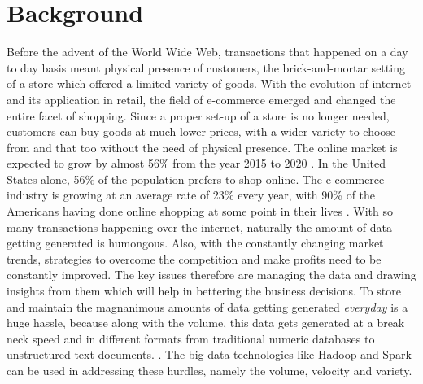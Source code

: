 \section{Background}
Before the advent of the World Wide Web, transactions that happened on a day to day basis meant physical presence of customers, the brick-and-mortar setting of a store which offered a limited variety of goods. With the evolution of internet and its application in retail, the field of e-commerce emerged and changed the entire facet of shopping. Since a proper set-up of a store is no longer needed, customers can buy goods at much lower prices, with a wider variety to choose from and that too without the need of physical presence. The online market is expected to grow by almost 56\% from the year 2015 to 2020 \cite{link2}. In the United States alone, 56\% of the population prefers to shop online. The e-commerce industry is growing at an average rate of 23\% every year, with 90\% of the Americans having done online shopping at some point in their lives \cite{link3}. With so many transactions happening over the internet, naturally the amount of data getting generated is humongous. Also, with the constantly changing market trends, strategies to overcome the competition and make profits need to be constantly improved. The key issues therefore are managing the data and drawing insights from them which will help in bettering the business decisions. To store and maintain the magnanimous amounts of data getting generated \emph{everyday} is a huge hassle, because along with the volume, this data gets generated at a break neck speed and in different formats from traditional numeric databases to unstructured text documents.   \cite{link4}. The big data technologies like Hadoop and Spark can be used in addressing these hurdles, namely the volume, velocity and variety.


